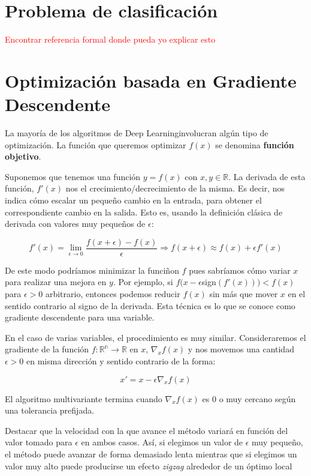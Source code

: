 	
	\section{Problema de clasificación}
	
	\textcolor{red}{Encontrar referencia formal donde pueda yo explicar esto}
	
	\section{Optimización basada en Gradiente Descendente}
	
	La mayoría de los algoritmos de Deep Learninginvolucran algún tipo de optimización. La función que queremos optimizar $f(x)$ se denomina \textbf{función objetivo}. 
	
	Suponemos que tenemos una función $y = f(x)$ con $x,y \in \mathbb{R}$. La derivada de esta función, $f'(x)$ nos el crecimiento/decrecimiento de la misma. Es decir, nos indica cómo escalar un pequeño cambio en la entrada, para obtener el correspondiente cambio en la salida. Esto es, usando la definición clásica de derivada con valores muy pequeños de $\epsilon$:
	
	$$
		f'(x) = \lim_{\epsilon \rightarrow 0} \frac{f(x+ \epsilon) - f(x)}{\epsilon} \Rightarrow f(x+ \epsilon) \approx f(x) + \epsilon f'(x)
	$$
	
	De este modo podríamos minimizar la funciñon $f$ pues sabríamos cómo variar $x$ para realizar una mejora en $y$. Por ejemplo, si $f(x - \epsilon$sign$(f'(x))) < f(x)$ para $\epsilon > 0$ arbitrario, entonces podemos reducir $f(x)$ sin más que mover $x$  en el sentido contrario al signo de la derivada. Esta técnica es lo que se conoce como gradiente descendente para una variable. 
	
	En el caso de varias variables, el procedimiento es muy similar. Consideraremos el gradiente de la función $f: \mathbb{R^n} \rightarrow \mathbb{R}$ en $x$, $\nabla_x f(x)$ y nos movemos una cantidad $\epsilon > 0$ en misma dirección y sentido contrario de la forma:
	
	$$
		x' = x - \epsilon \nabla_x f(x)	
	$$ 

	El algoritmo multivariante termina cuando $\nabla_x f(x)$ es 0 o muy cercano según una tolerancia prefijada.
	
	Destacar que la velocidad con la que avance el método variará en función del valor tomado para $\epsilon$ en ambos casos. Así, si elegimos un valor de $\epsilon$ muy pequeño, el método puede avanzar de forma demasiado lenta mientras que si elegimos un valor muy alto puede producirse un efecto \textit{zigzag} alrededor de un óptimo local
	
